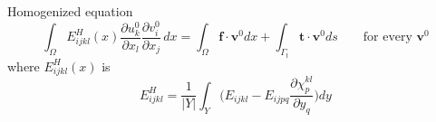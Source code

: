 \documentclass[openright,twoside]{iitkthesis}
\begin{document}
Homogenized equation
\begin{equation}
\int_\Omega E^H_{ijkl}(x)\frac{\partial u_{k}^0}{\partial x_l}\frac{\partial v_{i}^0}{\partial x_j}\,dx = \int_\Omega\textbf{f}\cdot\textbf{v}^0 dx + \int_{\Gamma_t}\textbf{t}\cdot\textbf{v}^0 ds \qquad \text{for every } \textbf{v}^0
\end{equation}
where $E^H_{ijkl}(x)$ is
\begin{equation}
\label{eq:homogenized}
\boxed{E^H_{ijkl} = \frac{1}{|Y|}\int_Y \bigg (E_{ijkl}-E_{ijpq}\frac{\partial \chi^{kl}_p}{\partial y_q}\bigg ) dy}
\end{equation}
\end{document}

